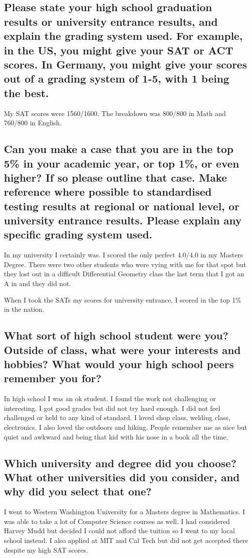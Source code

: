 \documentclass[letter,12pt]{article}
\begin{document}
\subsection{Please state your high school graduation results or university entrance results, and explain the grading system used. For example, in the US, you might give your SAT or ACT scores. In Germany, you might give your scores out of a grading system of 1-5, with 1 being the best.}
My SAT scores were 1560/1600. The breakdown was 800/800 in Math and 760/800 in English.

\subsection{Can you make a case that you are in the top 5\% in your academic year, or top 1\%, or even higher? If so please outline that case. Make reference where possible to standardised testing results at regional or national level, or university entrance results. Please explain any specific grading system used.}
In my university I certainly was. I scored the only perfect 4.0/4.0 in my Masters Degree. There were two other students who were vying with me for that spot but they lost out in a difficult Differential Geometry class the last term that I got an A in and they did not.

When I took the SATs my scores for university entrance, I scored in the top 1\% in the nation.

\subsection{What sort of high school student were you? Outside of class, what were your interests and hobbies? What would your high school peers remember you for?}
In high school I was an ok student. I found the work not challenging or interesting. I got good grades but did not try hard enough. I did not feel challenged or held to any kind of standard. I loved shop class, welding class, electronics. I also loved the outdoors and hiking. People remember me as nice but quiet and awkward and being that kid with his nose in a book all the time.

\subsection{Which university and degree did you choose? What other universities did you consider, and why did you select that one?}
I went to Western Washington University for a Masters degree in Mathematics. I was able to take a lot of Computer Science courses as well. I had considered Harvey Mudd but decided I could not afford the tuition so I went to my local school instead. I also applied at MIT and Cal Tech but did not get accepted there despite my high SAT scores.
\end{document}
